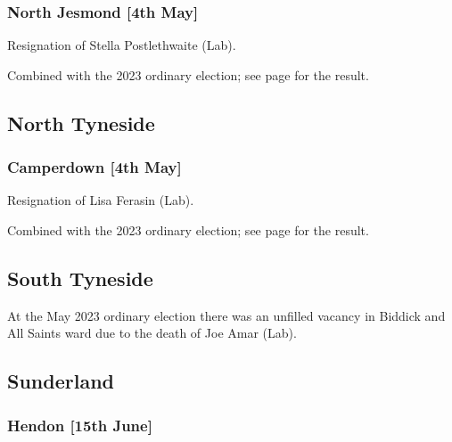 \documentclass[a4paper,openany]{book}
\begin{document}
\begin{resultsiii}
\subsubsection*{North Jesmond \hspace*{\fill}\nolinebreak[1]%
	\enspace\hspace*{\fill}
	[4th May]}


Resignation of Stella Postlethwaite (Lab).

Combined with the 2023 ordinary election; see page \pageref{NorthJesmondNewcastleTyne} for the result.

\subsection*{North Tyneside}

\subsubsection*{Camperdown \hspace*{\fill}\nolinebreak[1]%
	\enspace\hspace*{\fill}
	[4th May]}


Resignation of Lisa Ferasin (Lab).

Combined with the 2023 ordinary election; see page \pageref{NorthTynesideCamperdown} for the result.

\subsection*{South Tyneside}

At the May 2023 ordinary election there was an unfilled vacancy in Biddick and All Saints ward due to the death of Joe Amar (Lab).%

\subsection*{Sunderland}

\subsubsection*{Hendon \hspace*{\fill}\nolinebreak[1]%
	\enspace\hspace*{\fill}
	[15th June]}


\end{resultsiii}
\end{document}
